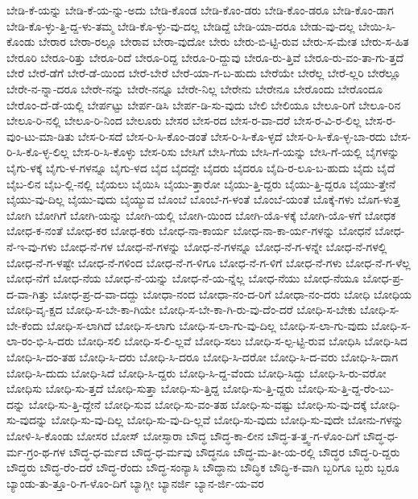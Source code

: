 {ಬೇಡಿ-ಕೆ-ಯನ್ನು
ಬೇಡಿ-ಕೆ-ಯ-ನ್ನು-ಅದು
ಬೇಡಿ-ಕೊಂಡ
ಬೇಡಿ-ಕೊಂ-ಡರು
ಬೇಡಿ-ಕೊಂ-ಡರೂ
ಬೇಡಿ-ಕೊಂ-ಡಾಗ
ಬೇಡಿ-ಕೊ-ಳ್ಳು-ತ್ತಿ-ದ್ದ-ಳು-ತಮ್ಮ
ಬೇಡಿ-ಕೊ-ಳ್ಳು-ವು-ದಲ್ಲ
ಬೇಡಿದ್ದೆ
ಬೇಡಿ-ಯಾ-ದರೂ
ಬೇಡು-ವು-ದಲ್ಲ
ಬೇಯಿ-ಸಿ-ಕೊಂಡು
ಬೇರಾರ
ಬೇರಾ-ರಲ್ಲೂ
ಬೇರಾವ
ಬೇರಾ-ವುದೋ
ಬೇರು
ಬೇರು-ಬಿ-ಟ್ಟಿ-ರುವ
ಬೇರು-ಸ-ಮೇತ
ಬೇರು-ಸ-ಹಿತ
ಬೇರೂರಿ
ಬೇರೂ-ರಿತ್ತು
ಬೇರೂ-ರಿದೆ
ಬೇರೂ-ರಿದ್ದ
ಬೇರೂ-ರಿ-ದ್ದುವು
ಬೇರೂ-ರು-ತ್ತಿವೆ
ಬೇರೂ-ರು-ವಂ-ತಾ-ಗು-ತ್ತದೆ
ಬೇರೆ
ಬೇರೆ-ಡೆಗೆ
ಬೇರೆ-ಡೆ-ಯಿಂದ
ಬೇರೆ-ಬೇರೆ
ಬೇರೆ-ಯಾ-ಗ-ಬ-ಹುದು
ಬೇರೆಯೇ
ಬೇರೆಲ್ಲ
ಬೇರೆ-ಲ್ಲರಿ
ಬೇರೆಲ್ಲೂ
ಬೇರೇ-ನ-ನ್ನಾ-ದರೂ
ಬೇರೇ-ನನ್ನು
ಬೇರೇ-ನನ್ನೂ
ಬೇರೇ-ನಿಲ್ಲ
ಬೇರೇನು
ಬೇರೇನೂ
ಬೇರೊಂದು
ಬೇರೊಂದೂ
ಬೇರೊಂ-ದೆ-ಡೆ-ಯಲ್ಲಿ
ಬೇರ್ಪಟ್ಟು
ಬೇರ್ಪ-ಡಿಸಿ
ಬೇರ್ಪ-ಡಿ-ಸು-ವುದು
ಬೇಲಿ
ಬೇಲಿಯೂ
ಬೇಲೂ-ರಿಗೆ
ಬೇಲೂ-ರಿನ
ಬೇಲೂ-ರಿ-ನಲ್ಲಿ
ಬೇಲೂ-ರಿ-ನಿಂದ
ಬೇಲೂರು
ಬೇಸರ
ಬೇಸ-ರದ
ಬೇಸ-ರ-ವಾ-ದರೆ
ಬೇಸ-ರ-ವಿ-ರ-ಲಿಲ್ಲ
ಬೇಸ-ರ-ವುಂ-ಟು-ಮಾ-ಡಿತು
ಬೇಸ-ರಿ-ಸದೆ
ಬೇಸ-ರಿ-ಸಿ-ಕೊಂ-ಡಂತೆ
ಬೇಸ-ರಿ-ಸಿ-ಕೊ-ಳ್ಳದೆ
ಬೇಸ-ರಿ-ಸಿ-ಕೊ-ಳ್ಳ-ಬಾ-ರದು
ಬೇಸ-ರಿ-ಸಿ-ಕೊ-ಳ್ಳ-ಲಿಲ್ಲ
ಬೇಸ-ರಿ-ಸಿ-ಕೊಳ್ಳು
ಬೇಸ-ರಿಸು
ಬೇಸಿಗೆ
ಬೇಸಿ-ಗೆಯ
ಬೇಸಿ-ಗೆ-ಯನ್ನು
ಬೇಸಿ-ಗೆ-ಯಲ್ಲಿ
ಬೈಗಳನ್ನು
ಬೈಗು-ಳಕ್ಕೆ
ಬೈಗು-ಳ-ಗಳನ್ನೂ
ಬೈಗು-ಳದ
ಬೈದ
ಬೈದದ್ದೇ
ಬೈದರು
ಬೈದರೂ
ಬೈದಿ-ರ-ಲೂ-ಬ-ಹುದು
ಬೈದು
ಬೈದೆ
ಬೈಬ-ಲಿನ
ಬೈಬ-ಲ್ಲಿ-ನಲ್ಲಿ
ಬೈಯಲು
ಬೈಯಿಸಿ
ಬೈಯು-ತ್ತಾರೋ
ಬೈಯು-ತ್ತಿ-ದ್ದರು
ಬೈಯು-ತ್ತಿ-ದ್ದರೂ
ಬೈಯು-ತ್ತೇನೆ
ಬೈಯು-ವು-ದಿಲ್ಲ
ಬೈಯು-ವುದು
ಬೈಯ್ಯುವ
ಬೊಂಬೆ
ಬೊಂಬೆ-ಗ-ಳಂತೆ
ಬೊಂಬೆ-ಯಂತೆ
ಬೊಕ್ಕೆ-ಗಳು
ಬೊಗ-ಳುತ್ತ
ಬೋಗಿ
ಬೋಗಿಗೆ
ಬೋಗಿ-ಯನ್ನು
ಬೋಗಿ-ಯಲ್ಲಿ
ಬೋಗಿ-ಯಿಂದ
ಬೋಗಿ-ಯೊ-ಳಕ್ಕೆ
ಬೋಗಿ-ಯೊ-ಳಗೆ
ಬೋಧಕ
ಬೋಧ-ಕ-ನಂತೆ
ಬೋಧ-ಕರ
ಬೋಧ-ಕರು
ಬೋಧ-ನಾ-ಕಾರ್ಯ
ಬೋಧ-ನಾ-ಕಾ-ರ್ಯ-ಗಳನ್ನು
ಬೋಧನೆ
ಬೋಧ-ನೆ-ಇ-ವು-ಗಳು
ಬೋಧ-ನೆ-ಗಳ
ಬೋಧ-ನೆ-ಗಳನ್ನು
ಬೋಧ-ನೆ-ಗಳನ್ನೂ
ಬೋಧ-ನೆ-ಗ-ಳನ್ನೇ
ಬೋಧ-ನೆ-ಗಳಲ್ಲಿ
ಬೋಧ-ನೆ-ಗ-ಳಷ್ಟೇ
ಬೋಧ-ನೆ-ಗಳಿಂದ
ಬೋಧ-ನೆ-ಗ-ಳಿಗೂ
ಬೋಧ-ನೆ-ಗ-ಳಿಗೆ
ಬೋಧ-ನೆ-ಗಳು
ಬೋಧ-ನೆ-ಗ-ಳೆಲ್ಲ
ಬೋಧ-ನೆಗೆ
ಬೋಧ-ನೆಯ
ಬೋಧ-ನೆ-ಯನ್ನು
ಬೋಧ-ನೆ-ಯ-ನ್ನೆಲ್ಲ
ಬೋಧ-ನೆಯು
ಬೋಧ-ನೆಯೂ
ಬೋಧ-ಪ್ರ-ದ-ವಾ-ಗಿತ್ತು
ಬೋಧ-ಪ್ರ-ದ-ವಾ-ದದ್ದು
ಬೋಧಾ-ನಂದ
ಬೋಧಾ-ನಂ-ದ-ರಿಗೆ
ಬೋಧಾ-ನಂ-ದರು
ಬೋಧಿ
ಬೋಧಿಯ
ಬೋಧಿ-ವೃ-ಕ್ಷದ
ಬೋಧಿ-ಸ-ಬೇ-ಕಾ-ಗಿಯೇ
ಬೋಧಿ-ಸ-ಬೇ-ಕಾ-ಗಿ-ರು-ವು-ದೆಂ-ದರೆ
ಬೋಧಿ-ಸ-ಬೇಕು
ಬೋಧಿ-ಸ-ಬೇ-ಕೆಂದು
ಬೋಧಿ-ಸ-ಲಾಗಿದೆ
ಬೋಧಿ-ಸ-ಲಾಗು
ಬೋಧಿ-ಸ-ಲಾ-ಗು-ವು-ದಿಲ್ಲ
ಬೋಧಿ-ಸ-ಲಾ-ಗು-ವುದು
ಬೋಧಿ-ಸ-ಲಾ-ರಂ-ಭಿ-ಸಿ-ದರು
ಬೋಧಿ-ಸಲಿ
ಬೋಧಿ-ಸ-ಲಿ-ಲ್ಲವೆ
ಬೋಧಿ-ಸಲು
ಬೋಧಿ-ಸ-ಲ್ಪ-ಟ್ಟಿ-ರುವ
ಬೋಧಿಸಿ
ಬೋಧಿ-ಸಿದ
ಬೋಧಿ-ಸಿ-ದಂ-ತಹ
ಬೋಧಿ-ಸಿ-ದರು
ಬೋಧಿ-ಸಿ-ದರೂ
ಬೋಧಿ-ಸಿ-ದರೋ
ಬೋಧಿ-ಸಿ-ದ-ವರು
ಬೋಧಿ-ಸಿ-ದಾಗ
ಬೋಧಿ-ಸಿ-ದುದು
ಬೋಧಿ-ಸಿದೆ
ಬೋಧಿ-ಸಿ-ದ್ದರು
ಬೋಧಿ-ಸಿ-ದ್ದ-ವೆಂದು
ಬೋಧಿ-ಸಿದ್ದು
ಬೋಧಿ-ಸಿ-ರು-ವರೋ
ಬೋಧಿಸು
ಬೋಧಿ-ಸು-ತ್ತದೆ
ಬೋಧಿ-ಸುತ್ತಾ
ಬೋಧಿ-ಸು-ತ್ತಿದ್ದ
ಬೋಧಿ-ಸು-ತ್ತಿ-ದ್ದರು
ಬೋಧಿ-ಸು-ತ್ತಿ-ದ್ದ-ರೆಂ-ಬು-ದನ್ನು
ಬೋಧಿ-ಸು-ತ್ತಿ-ದ್ದೇನೆ
ಬೋಧಿ-ಸುವ
ಬೋಧಿ-ಸು-ವಂ-ತಹ
ಬೋಧಿ-ಸು-ವಷ್ಟು
ಬೋಧಿ-ಸು-ವು-ದಕ್ಕೆ
ಬೋಧಿ-ಸು-ವುದನ್ನು
ಬೋಧಿ-ಸು-ವು-ದಿಲ್ಲ
ಬೋಧಿ-ಸು-ವು-ದಿ-ಲ್ಲವೆ
ಬೋಧಿ-ಸು-ವುದು
ಬೋಧಿ-ಸು-ವುದೇ
ಬೋನು-ಗಳನ್ನು
ಬೋಳಿ-ಸಿ-ಕೊಂಡು
ಬೋಸರ
ಬೋಸ್
ಬೋಸ್ಪಾರಾ
ಬೌದ್ಧ
ಬೌದ್ಧ-ಕಾ-ಲೀನ
ಬೌದ್ಧ-ತ-ತ್ತ್ವ-ಗ-ಳೊಂ-ದಿಗೆ
ಬೌದ್ಧ-ಧ-ರ್ಮ-ಗ್ರಂ-ಥ-ಗಳ
ಬೌದ್ಧ-ಧ-ರ್ಮದ
ಬೌದ್ಧ-ಧ-ರ್ಮವು
ಬೌದ್ಧನೂ
ಬೌದ್ಧ-ಮ-ತೀ-ಯ-ರಲ್ಲಿ
ಬೌದ್ಧರ
ಬೌದ್ಧ-ರಿ-ದ್ದರು
ಬೌದ್ಧರು
ಬೌದ್ಧ-ರೆಂ-ದರೆ
ಬೌದ್ಧ-ರೆಂದು
ಬೌದ್ಧ-ಸಂನ್ಯಾಸಿ
ಬೌದ್ಧಾನು
ಬೌದ್ಧಿಕ
ಬೌದ್ಧಿ-ಕ-ವಾಗಿ
ಬ್ಬರಿಗೂ
ಬ್ಬರು
ಬ್ಬರೂ
ಬ್ಯಾಂಡು-ತು-ತ್ತೂ-ರಿ-ಗ-ಳೊಂ-ದಿಗೆ
ಬ್ಯಾಗ್ಲೀ
ಬ್ಯಾನರ್ಜಿ
ಬ್ಯಾನ-ರ್ಜಿ-ಯ-ವರ
}
